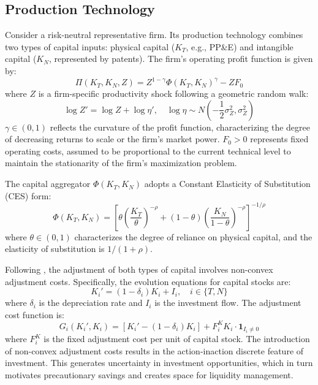 \documentclass[12pt,a4paper]{article}
\begin{document}
\subsection{Production Technology}
Consider a risk-neutral representative firm. Its production technology combines two types of capital inputs: physical capital ($K_T$, e.g., PP\&E) and intangible capital ($K_N$, represented by patents). The firm’s operating profit function is given by:
\begin{equation}
\Pi(K_T, K_N, Z) = Z^{1-\gamma} \Phi(K_T, K_N)^\gamma - ZF_0
\end{equation}
where $Z$ is a firm-specific productivity shock following a geometric random walk:
\begin{equation}
\log Z' = \log Z + \log \eta', \quad \log \eta \sim N(-\frac{1}{2}\sigma_Z^2, \sigma_Z^2)
\end{equation}
$\gamma \in (0,1)$ reflects the curvature of the profit function, characterizing the degree of decreasing returns to scale or the firm's market power. $F_0 > 0$ represents fixed operating costs, assumed to be proportional to the current technical level to maintain the stationarity of the firm's maximization problem.

The capital aggregator $\Phi(K_T, K_N)$ adopts a Constant Elasticity of Substitution (CES) form:
\begin{equation}
\Phi(K_T, K_N) = \left[ \theta \left( \frac{K_T}{\theta} \right)^{-\rho} + (1-\theta) \left( \frac{K_N}{1-\theta} \right)^{-\rho} \right]^{-1/\rho}
\end{equation}
where $\theta \in (0,1)$ characterizes the degree of reliance on physical capital, and the elasticity of substitution is $1/(1+\rho)$. 

Following \cite{abel1993unified}, the adjustment of both types of capital involves non-convex adjustment costs. Specifically, the evolution equations for capital stocks are:
\begin{equation}
K_i' = (1-\delta_i)K_i + I_i, \quad i \in \{T, N\}
\end{equation}
where $\delta_i$ is the depreciation rate and $I_i$ is the investment flow. The adjustment cost function is:
\begin{equation}
G_i(K_i', K_i) = [K_i' - (1-\delta_i)K_i] + F_i^K K_i \cdot \mathbf{1}_{I_i \neq 0}
\end{equation}
where $F_i^K$ is the fixed adjustment cost per unit of capital stock. The introduction of non-convex adjustment costs results in the action-inaction discrete feature of investment. This generates uncertainty in investment opportunities, which in turn motivates precautionary savings and creates space for liquidity management.
\end{document}
